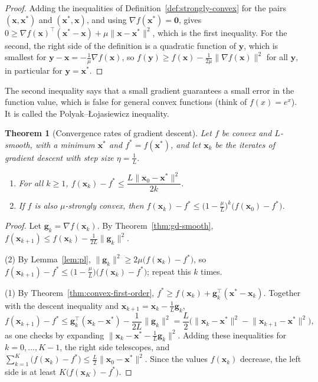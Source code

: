 \documentclass[11pt]{article}
\newcommand{\norm}[1]{\lVert #1 \rVert}
\theoremstyle{definition}
\theoremstyle{plain}
\newtheorem{theorem}[definition]{Theorem}
\theoremstyle{remark}
\begin{document}
\begin{proof}
    Adding the inequalities of Definition~\ref{def:strongly-convex} for the pairs $(\mathbf{x}, \mathbf{x}^*)$ and $(\mathbf{x}^*, \mathbf{x})$, and using $\nabla f(\mathbf{x}^*) = \mathbf{0}$, gives $0 \geq \nabla f(\mathbf{x})^\top(\mathbf{x}^* - \mathbf{x}) + \mu\norm{\mathbf{x} - \mathbf{x}^*}^2$, which is the first inequality. For the second, the right side of the definition is a quadratic function of $\mathbf{y}$, which is smallest for $\mathbf{y} - \mathbf{x} = -\frac{1}{\mu}\nabla f(\mathbf{x})$, so $f(\mathbf{y}) \geq f(\mathbf{x}) - \frac{1}{2\mu}\norm{\nabla f(\mathbf{x})}^2$ for all $\mathbf{y}$, in particular for $\mathbf{y} = \mathbf{x}^*$.
\end{proof}

The second inequality says that a small gradient guarantees a small error in the function value, which is false for general convex functions (think of $f(x) = e^x$). It is called the Polyak--{\L}ojasiewicz inequality.

\begin{theorem}[Convergence rates of gradient descent]\label{thm:gd-rates}
    Let $f$ be convex and $L$-smooth, with a minimum $\mathbf{x}^*$ and $f^* = f(\mathbf{x}^*)$, and let $\mathbf{x}_k$ be the iterates of gradient descent with step size $\eta = \frac{1}{L}$.
    \begin{enumerate}
        \item For all $k \geq 1$, $f(\mathbf{x}_k) - f^* \leq \dfrac{L\norm{\mathbf{x}_0 - \mathbf{x}^*}^2}{2k}$.
        \item If $f$ is also $\mu$-strongly convex, then $f(\mathbf{x}_k) - f^* \leq \big(1 - \frac{\mu}{L}\big)^k\big(f(\mathbf{x}_0) - f^*\big)$.
    \end{enumerate}
\end{theorem}

\begin{proof}
    Let $\mathbf{g}_k = \nabla f(\mathbf{x}_k)$. By Theorem~\ref{thm:gd-smooth}, $f(\mathbf{x}_{k+1}) \leq f(\mathbf{x}_k) - \frac{1}{2L}\norm{\mathbf{g}_k}^2$.

    (2) By Lemma~\ref{lem:pl}, $\norm{\mathbf{g}_k}^2 \geq 2\mu\big(f(\mathbf{x}_k) - f^*\big)$, so $f(\mathbf{x}_{k+1}) - f^* \leq \big(1 - \frac{\mu}{L}\big)\big(f(\mathbf{x}_k) - f^*\big)$; repeat this $k$ times.

    (1) By Theorem~\ref{thm:convex-first-order}, $f^* \geq f(\mathbf{x}_k) + \mathbf{g}_k^\top(\mathbf{x}^* - \mathbf{x}_k)$. Together with the descent inequality and $\mathbf{x}_{k+1} = \mathbf{x}_k - \frac{1}{L}\mathbf{g}_k$,
    \[f(\mathbf{x}_{k+1}) - f^* \leq \mathbf{g}_k^\top(\mathbf{x}_k - \mathbf{x}^*) - \frac{1}{2L}\norm{\mathbf{g}_k}^2 = \frac{L}{2}\Big(\norm{\mathbf{x}_k - \mathbf{x}^*}^2 - \norm{\mathbf{x}_{k+1} - \mathbf{x}^*}^2\Big),\]
    as one checks by expanding $\norm{\mathbf{x}_k - \mathbf{x}^* - \frac{1}{L}\mathbf{g}_k}^2$. Adding these inequalities for $k = 0, \ldots, K - 1$, the right side telescopes, and $\sum_{k=1}^K \big(f(\mathbf{x}_k) - f^*\big) \leq \frac{L}{2}\norm{\mathbf{x}_0 - \mathbf{x}^*}^2$. Since the values $f(\mathbf{x}_k)$ decrease, the left side is at least $K\big(f(\mathbf{x}_K) - f^*\big)$.
\end{proof}
\end{document}
